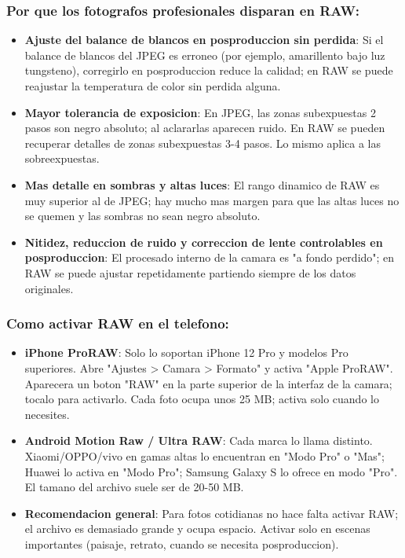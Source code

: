 \subsubsection*{Por que los fotografos profesionales disparan en RAW:}

\begin{itemize}
  \item \textbf{Ajuste del balance de blancos en posproduccion sin perdida}: Si el balance de blancos del JPEG es erroneo (por ejemplo, amarillento bajo luz tungsteno), corregirlo en posproduccion reduce la calidad; en RAW se puede reajustar la temperatura de color sin perdida alguna.
  \item \textbf{Mayor tolerancia de exposicion}: En JPEG, las zonas subexpuestas 2 pasos son negro absoluto; al aclararlas aparecen ruido. En RAW se pueden recuperar detalles de zonas subexpuestas 3-4 pasos. Lo mismo aplica a las sobreexpuestas.
  \item \textbf{Mas detalle en sombras y altas luces}: El rango dinamico de RAW es muy superior al de JPEG; hay mucho mas margen para que las altas luces no se quemen y las sombras no sean negro absoluto.
  \item \textbf{Nitidez, reduccion de ruido y correccion de lente controlables en posproduccion}: El procesado interno de la camara es "a fondo perdido"; en RAW se puede ajustar repetidamente partiendo siempre de los datos originales.
\end{itemize}

\subsubsection*{Como activar RAW en el telefono:}

\begin{itemize}
  \item \textbf{iPhone ProRAW}: Solo lo soportan iPhone 12 Pro y modelos Pro superiores. Abre "Ajustes > Camara > Formato" y activa "Apple ProRAW". Aparecera un boton "RAW" en la parte superior de la interfaz de la camara; tocalo para activarlo. Cada foto ocupa unos 25 MB; activa solo cuando lo necesites.
  \item \textbf{Android Motion Raw / Ultra RAW}: Cada marca lo llama distinto. Xiaomi/OPPO/vivo en gamas altas lo encuentran en "Modo Pro" o "Mas"; Huawei lo activa en "Modo Pro"; Samsung Galaxy S lo ofrece en modo "Pro". El tamano del archivo suele ser de 20-50 MB.
  \item \textbf{Recomendacion general}: Para fotos cotidianas no hace falta activar RAW; el archivo es demasiado grande y ocupa espacio. Activar solo en escenas importantes (paisaje, retrato, cuando se necesita posproduccion).
\end{itemize}

